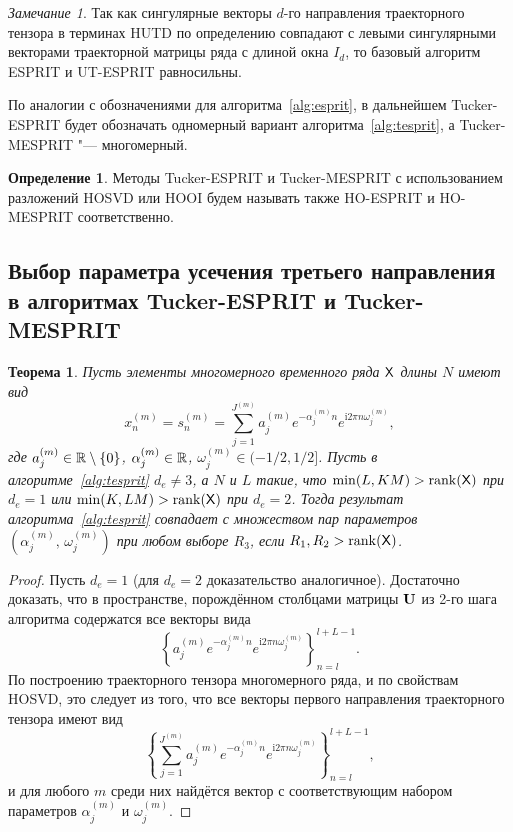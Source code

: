 \documentclass[specialist,
  substylefile = spbu.rtx,
subf,href,colorlinks=true, 12pt]{disser}
\theoremstyle{plain}
\newtheorem{theorem}{Теорема}[section]
\theoremstyle{definition}
\newtheorem{definition}{Определение}[section]
\theoremstyle{remark}
\newtheorem{remark}{Замечание}[section]
\newcommand{\iu}{\mathrm{i}}
\def\newdecomp/{HUTD}
\def\newtesprit/{UT-ESPRIT}
\def\tesprit/{Tucker-ESPRIT}
\def\tmesprit/{Tucker-MESPRIT}
\begin{document}
\begin{remark}\label{remark:newesprit-same-esprit}
  Так как сингулярные векторы $d$-го направления траекторного
  тензора в терминах
  \newdecomp/ по определению совпадают с левыми сингулярными векторами
  траекторной матрицы ряда с длиной окна $I_d$, то базовый алгоритм
  ESPRIT и \newtesprit/ равносильны.
\end{remark}

По аналогии с обозначениями для алгоритма~\ref{alg:esprit},
в дальнейшем \tesprit/ будет обозначать одномерный вариант
алгоритма~\ref{alg:tesprit}, а \tmesprit/ "--- многомерный.

\begin{definition}
  Методы \tesprit/ и \tmesprit/ с использованием разложений HOSVD или
  HOOI будем называть также HO-ESPRIT и HO-MESPRIT соответственно.
\end{definition}

\subsection{Выбор параметра усечения третьего направления в алгоритмах
\tesprit/ и \tmesprit/}\label{subsec:tesprit-r3}
\begin{theorem}\label{theorem:tmesprit-r3}
  Пусть элементы многомерного временного ряда $\mathsf{X}$ длины $N$ имеют вид
  \begin{equation*}
    x_n^{(m)} = s_n^{(m)} = \sum_{j=1}^{J^{(m)}}
    a_j^{(m)} e^{-\alpha_j^{(m)} n} e^{\iu
    2 \pi n \omega_j^{(m)}},
  \end{equation*}
  где $a_j^{(m)} \in \mathbb{R} \setminus \{0\}$, $\alpha_j^{(m)} \in \mathbb{R}$,
  $\omega_j^{(m)} \in (-1/2, 1/2]$.
  Пусть в алгоритме~\ref{alg:tesprit} $d_e \ne 3$, а $N$ и $L$ такие,
  что $\min(L, KM) > \operatorname{rank}(\mathsf{X})$
  при $d_e=1$ или $\min(K, LM) > \operatorname{rank}(\mathsf{X})$ при $d_e=2$.
  Тогда результат алгоритма~\ref{alg:tesprit} совпадает с множеством
  пар параметров $(\alpha_j^{(m)},\, \omega_j^{(m)})$ при любом
  выборе $R_3$,
  если $R_1, R_2 >
  \operatorname{rank}(\mathsf{X})$.
\end{theorem}
\begin{proof}
  Пусть $d_e = 1$ (для $d_e=2$ доказательство аналогичное). Достаточно
  доказать, что в пространстве, порождённом столбцами
  матрицы $\mathbf{U}$ из 2-го шага алгоритма содержатся все векторы вида
  \[
    \left\{a_j^{(m)} e^{-\alpha_j^{(m)} n} e^{\iu
    2 \pi n \omega_j^{(m)}}\right\}_{n=l}^{l+L-1}.
  \]
  По построению траекторного тензора многомерного ряда, и по
  свойствам HOSVD, это
  следует из того, что все векторы первого направления траекторного
  тензора имеют вид
  \[
    \left\{\sum_{j=1}^{J^{(m)}} a_j^{(m)} e^{-\alpha_j^{(m)} n} e^{\iu
    2 \pi n \omega_j^{(m)}}\right\}_{n=l}^{l + L - 1},
  \]
  и для любого $m$ среди них найдётся вектор с соответствующим
  набором параметров $\alpha_j^{(m)}$ и $\omega_j^{(m)}$.
\end{proof}
\end{document}
